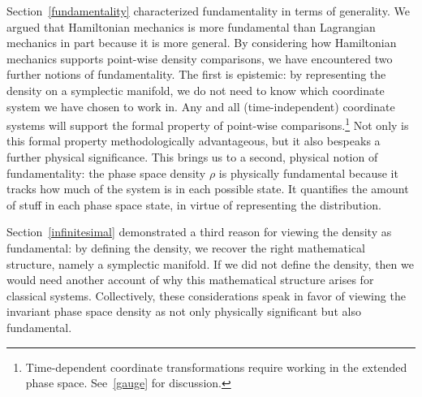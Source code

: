 \documentclass[letterpaper]{article}
\begin{document}

Section~\ref{fundamentality} characterized fundamentality in terms of generality. We argued that Hamiltonian mechanics is more fundamental than Lagrangian mechanics in part because it is more general. By considering how Hamiltonian mechanics supports point-wise density comparisons, we have encountered two further notions of fundamentality. The first is epistemic: by representing the density on a symplectic manifold, we do not need to know which coordinate system we have chosen to work in. Any and all (time-independent) coordinate systems will support the formal property of point-wise comparisons.\footnote{Time-dependent coordinate transformations require working in the extended phase space. See~\ref{gauge} for discussion.} Not only is this formal property methodologically advantageous, but it also bespeaks a further physical significance. This brings us to a second, physical notion of fundamentality: the phase space density $\rho$ is physically fundamental because it tracks how much of the system is in each possible state. It quantifies the amount of stuff in each phase space state, in virtue of representing the distribution. 

Section~\ref{infinitesimal} demonstrated a third reason for viewing the density as fundamental: by defining the density, we recover the right mathematical structure, namely a symplectic manifold. If we did not define the density, then we would need another account of why this mathematical structure arises for classical systems. Collectively, these considerations speak in favor of viewing the invariant phase space density as not only physically significant but also fundamental. 
\end{document}

